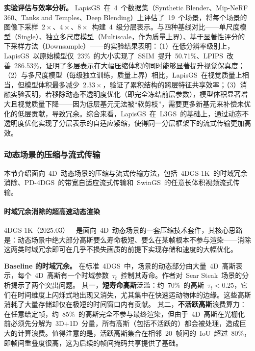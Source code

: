 \textbf{实验评估与效率分析。}
LapisGS~在~4~个数据集（Synthetic Blender、Mip-NeRF 360、Tanks and Temples、Deep Blending）上评估了~19~个场景，将每个场景的图像下采样~$2\times$、$4\times$、$8\times$~构建~4~级分层表示。与四种基线对比——单尺度模型（Single）、独立多尺度模型（Multiscale，作为质量上界）、基于显著性评分的下采样方法（Downsample）——的实验结果表明：（1）在低分辨率级别上，LapisGS~以原始模型仅~23\%~的大小实现了~SSIM~提升~50.71\%、LPIPS~改善~286.53\%，证明了多层表示在大幅压缩体积的同时能够显著提升视觉保真度；（2）与多尺度模型（每级独立训练，质量上界）相比，LapisGS~在视觉质量上相当，但模型体积最多减少~$2.33\times$，验证了累积结构的跨层特征共享效率；（3）消融实验表明，若移除动态不透明度优化（即完全冻结前层参数），模型体积显著增大且视觉质量下降——因为低层基元无法被``软剪枝''，需要更多新基元来补偿未优化的低层贡献，导致冗余。综合来看，LapisGS~在~L3GS~的基础上，通过动态不透明度优化实现了分层表示的自适应紧缩，使得同一分层框架下的流式传输更加高效。

\subsubsection{动态场景的压缩与流式传输}

本节介绍面向~4D~动态场景的压缩与流式传输方法，包括~4DGS-1K~的时域冗余消除、PD-4DGS~的带宽自适应流式传输和~SwinGS~的任意长体积视频流式传输。

\paragraph{时域冗余消除的超高速动态渲染}

4DGS-1K（2025.03）~\cite{2503_16422}~是面向~4D~动态场景的一套压缩技术套件，其核心思路是：动态场景中绝大部分高斯要么寿命极短、要么在某帧根本不参与渲染——消除这两类时域冗余即可在几乎不损失画质的前提下实现存储和速度的大幅优化。

\smallskip\noindent\textbf{Baseline 的时域冗余。}
在标准~4DGS~中，场景的动态部分由大量~4D~高斯表示，每个~4D~高斯有一个时域参数~$\tau_t$~控制其寿命。作者对~Sear Steak~场景的分析揭示了两个突出问题。
其一，\textbf{短寿命高斯}泛滥：约~70\%~的高斯~$\tau_t < 0.25$，它们在时间维度上闪烁式地出现又消失，尤其集中在快速运动物体的边缘。这些高斯消耗了大量存储却仅在极短的时间窗口内有贡献。
其二，\textbf{不活跃高斯}浪费算力：在任意给定帧，约~85\%~的高斯完全不参与最终渲染，但由于~4D~高斯在光栅化前必须先分解为~3D+1D~分量，所有高斯（包括不活跃的）都会被处理，造成巨大的计算浪费。值得注意的是，活跃高斯集合在相邻~20~帧间的~IoU~超过~80\%，即帧间重叠度很高，这为后续的帧间掩码共享提供了基础。

